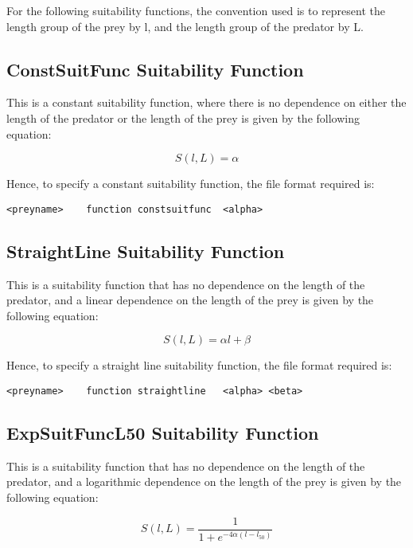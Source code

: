 \documentclass [a4paper, 10pt]{book}
\begin{document}
\bigskip
For the following suitability functions, the convention used is to represent the length group of the prey by l, and the length group of the predator by L.

\subsection{ConstSuitFunc Suitability Function}
This is a constant suitability function, where there is no dependence on either the length of the predator or the length of the prey is given by the following equation:

\begin{equation}\label{eq:constsuit}
S(l, L) = \alpha
\end{equation}

Hence, to specify a constant suitability function, the file format required is:

{\small\begin{verbatim}
<preyname>    function constsuitfunc  <alpha>
\end{verbatim}}

\subsection{StraightLine Suitability Function}
This is a suitability function that has no dependence on the length of the predator, and a linear dependence on the length of the prey is given by the following equation:

\begin{equation}\label{eq:straightsuit}
S(l, L) = \alpha l + \beta
\end{equation}

\bigskip
Hence, to specify a straight line suitability function, the file format required is:

{\small\begin{verbatim}
<preyname>    function straightline   <alpha> <beta>
\end{verbatim}}

\subsection{ExpSuitFuncL50 Suitability Function}
This is a suitability function that has no dependence on the length of the predator, and a logarithmic dependence on the length of the prey is given by the following equation:

\begin{equation}\label{eq:l50suit}
S(l, L) = { \frac{1}{1 + e^{ -4 \alpha (l - l_{50})}}}
\end{equation}
\end{document}
